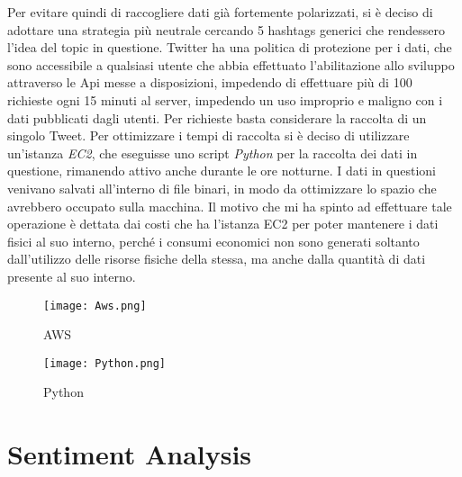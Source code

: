 Per evitare quindi di raccogliere dati già fortemente polarizzati, si è deciso di adottare una strategia più neutrale cercando 5 hashtags generici che rendessero l'idea del topic in questione.
Twitter ha una politica di protezione per i dati, che sono accessibile a qualsiasi utente che abbia effettuato l'abilitazione allo sviluppo attraverso le Api messe a disposizioni, impedendo di effettuare più di 100 richieste ogni 15 minuti al server, impedendo un uso improprio e maligno con i dati pubblicati dagli utenti. Per richieste basta considerare la raccolta di un singolo Tweet.
Per ottimizzare i tempi di raccolta si è deciso di utilizzare un'istanza \textit{EC2}, che eseguisse uno script \textit{Python} per la raccolta dei dati in questione, rimanendo attivo anche durante le ore notturne.
I dati in questioni venivano salvati all'interno di file binari, in modo da ottimizzare lo spazio che avrebbero occupato sulla macchina.
Il motivo che mi ha spinto ad effettuare tale operazione è dettata dai costi che ha l'istanza EC2 per poter mantenere i dati fisici al suo interno, perché i consumi economici non sono generati soltanto dall'utilizzo delle risorse fisiche della stessa, ma anche dalla quantità di dati presente al suo interno.
 

\begin{figure}[htbp]
\centering
\begin{minipage}[c]{.40\textwidth}
\centering\setlength{\captionmargin}{0pt}%
\texttt{[image: Aws.png]}
\caption{AWS}
\end{minipage}%
\hspace{10mm}%
\begin{minipage}[c]{.40\textwidth}
\centering\setlength{\captionmargin}{0pt}%
\texttt{[image: Python.png]}
\caption{Python}
\end{minipage}
\end{figure}

\section{Sentiment Analysis}